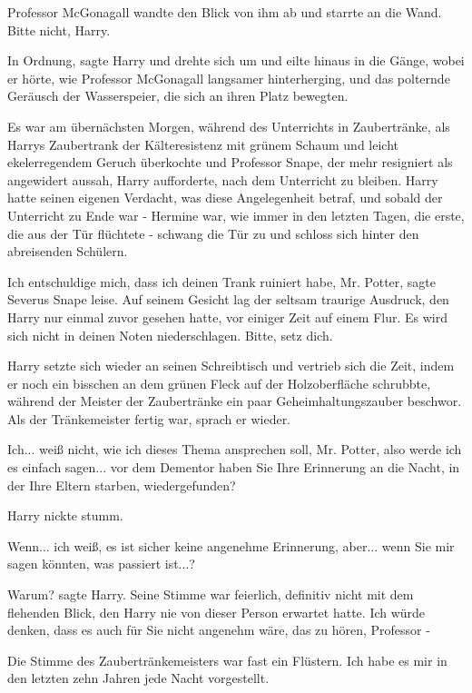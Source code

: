 Professor McGonagall wandte den Blick von ihm ab und starrte an die Wand. \glqq{}
Bitte nicht, Harry.\grqq{}

\glqq{}In Ordnung\grqq{}, sagte Harry und drehte sich um und eilte hinaus in die
Gänge, wobei er hörte, wie Professor McGonagall langsamer hinterherging, und das
polternde Geräusch der Wasserspeier, die sich an ihren Platz bewegten.

Es war am übernächsten Morgen, während des Unterrichts in Zaubertränke, als
Harrys Zaubertrank der Kälteresistenz mit grünem Schaum und leicht
ekelerregendem Geruch überkochte und Professor Snape, der mehr resigniert als
angewidert aussah, Harry aufforderte, nach dem Unterricht zu bleiben. Harry
hatte seinen eigenen Verdacht, was diese Angelegenheit betraf, und sobald der
Unterricht zu Ende war - Hermine war, wie immer in den letzten Tagen, die erste,
die aus der Tür flüchtete - schwang die Tür zu und schloss sich hinter den
abreisenden Schülern.

\glqq{}Ich entschuldige mich, dass ich deinen Trank ruiniert habe, Mr.
Potter\grqq{}, sagte Severus Snape leise. Auf seinem Gesicht lag der seltsam
traurige Ausdruck, den Harry nur einmal zuvor gesehen hatte, vor einiger Zeit
auf einem Flur. \glqq{}Es wird sich nicht in deinen Noten niederschlagen. Bitte,
setz dich.\grqq{}

Harry setzte sich wieder an seinen Schreibtisch und vertrieb sich die Zeit,
indem er noch ein bisschen an dem grünen Fleck auf der Holzoberfläche schrubbte,
während der Meister der Zaubertränke ein paar Geheimhaltungszauber beschwor. Als
der Tränkemeister fertig war, sprach er wieder.

\glqq{}Ich... weiß nicht, wie ich dieses Thema ansprechen soll, Mr. Potter, also
werde ich es einfach sagen... vor dem Dementor haben Sie Ihre Erinnerung an die
Nacht, in der Ihre Eltern starben, wiedergefunden?\grqq{}

Harry nickte stumm.

\glqq{}Wenn... ich weiß, es ist sicher keine angenehme Erinnerung, aber... wenn
Sie mir sagen könnten, was passiert ist...?\grqq{}

\glqq{}Warum?\grqq{} sagte Harry. Seine Stimme war feierlich, definitiv nicht mit
dem flehenden Blick, den Harry nie von dieser Person erwartet hatte. \glqq{}Ich
würde denken, dass es auch für Sie nicht angenehm wäre, das zu hören, Professor
-\grqq{}

Die Stimme des Zaubertränkemeisters war fast ein Flüstern. \glqq{}Ich habe es mir
in den letzten zehn Jahren jede Nacht vorgestellt.\grqq{}

